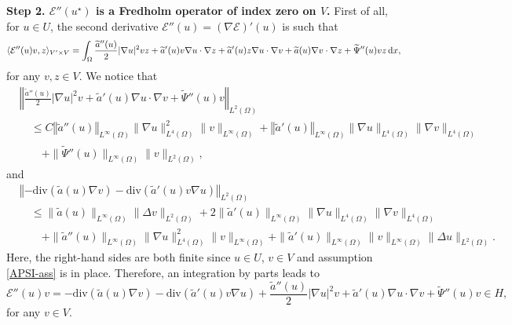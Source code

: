 \documentclass[11pt,reqno]{amsart}
\theoremstyle{remark}
\newcommand \norm[1] {\left\Vert #1\right\Vert}
\def\d{{\rm d}}
\def\E{\mathcal{E}}
\def\div{\mathrm{div}}
\numberwithin{equation}{section}
\def\d{{\rm d}}
\begin{document}
\smallskip

{\bf Step 2. $\E''(u^\star)$ is a Fredholm operator of index zero on $V$.}
First of all, for $u \in U$, the second derivative $\E''(u)= (\nabla \E )' (u)$ is such that
$$
\langle \E''(u)v,z\rangle_{V' \times V} =
\int_\Omega \frac{\widetilde{a}''(u)}{2}|\nabla u|^2vz+\widetilde{a}'(u)v\nabla u\cdot \nabla z+\widetilde{a}'(u)z\nabla u\cdot \nabla v+\widetilde{a}(u)\nabla v\cdot \nabla z+\widetilde{\Psi}''(u)vz \, \d x,
$$
for any $v, z \in V$. We notice that
\begin{align*}
&\norm{ \frac{\widetilde{a}''(u)}{2} |\nabla u|^2 v + \widetilde{a}'(u) \nabla u \cdot \nabla v + \widetilde{\Psi}''(u) v }_{L^2(\Omega)}
\\
&\quad \leq
C \norm{\widetilde{a}''(u)}_{L^\infty(\Omega)} \| \nabla u\|_{L^4(\Omega)}^2
\| v\|_{L^\infty(\Omega)} + \norm{\widetilde{a}'(u)}_{L^\infty(\Omega)} \| \nabla u\|_{L^4(\Omega)} \| \nabla v\|_{L^4(\Omega)}
\\
& \qquad
+ \| \widetilde{\Psi}''(u)\|_{L^\infty(\Omega)} \| v\|_{L^2(\Omega)},
\end{align*}
and
\begin{align*}
&\norm{ -\div( \widetilde{a}(u) \nabla v) -\div(\widetilde{a}'(u) v \nabla u) }_{L^2(\Omega)}
\\
&\quad  \leq
\| \widetilde{a}(u) \|_{L^\infty(\Omega)} \| \Delta v\|_{L^2(\Omega)} +
2 \| \widetilde{a}'(u)\|_{L^\infty(\Omega)} \| \nabla u\|_{L^4(\Omega)} \| \nabla v\|_{L^4(\Omega)}
\\
&\qquad
+ \| \widetilde{a}''(u) \|_{L^\infty(\Omega)} \| \nabla u\|_{L^4(\Omega)}^2 \| v\|_{L^\infty(\Omega)}
+ \| \widetilde{a}'(u)\|_{L^\infty(\Omega)} \| v\|_{L^\infty(\Omega)} \| \Delta u\|_{L^2(\Omega)}.
\end{align*}
Here, the right-hand sides are both finite since $u\in U$, $v \in V$ and assumption \eqref{APSI-ass} is in place.
Therefore, an integration by parts leads to
$$
\E''(u)v =-\div(\widetilde{a}(u)\nabla v)-\div (\widetilde{a}'(u)v\nabla u)+\frac{\widetilde{a}''(u)}{2}|\nabla u|^2v+\widetilde{a}'(u)\nabla u\cdot \nabla v+\widetilde{\Psi}''(u)v\in H,
$$
for any $v \in V$.
\end{document}
